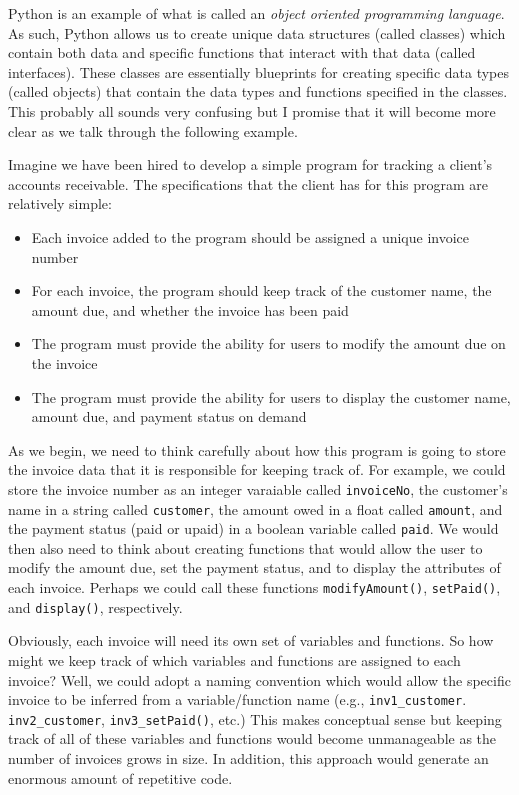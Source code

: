 \documentclass{book}
\begin{document}
Python is an example of what is called an \textit{object oriented programming language}. As such, Python allows us to create unique data structures (called classes) which contain both data and specific functions that interact with that data (called interfaces). These classes are essentially blueprints for creating specific data types (called objects) that contain the data types and functions specified in the classes. This probably all sounds very confusing but I promise that it will become more clear as we talk through the following example.

Imagine we have been hired to develop a simple program for tracking a client's accounts receivable. The specifications that the client has for this program are relatively simple:

\begin{itemize}
	\item Each invoice added to the program should be assigned a unique invoice number
	\item For each invoice, the program should keep track of the customer name, the amount due, and whether the invoice has been paid
	\item The program must provide the ability for users to modify the amount due on the invoice
	\item The program must provide the ability for users to display the customer name, amount due, and payment status on demand
\end{itemize}

As we begin, we need to think carefully about how this program is going to store the invoice data that it is responsible for keeping track of. For example, we could store the invoice number as an integer varaiable called \texttt{invoiceNo}, the customer's name in a string called \texttt{customer}, the amount owed in a float called \texttt{amount}, and the payment status (paid or upaid) in a boolean variable called \texttt{paid}. We would then also need to think about creating functions that would allow the user to modify the amount due, set the payment status, and to display the attributes of each invoice. Perhaps we could call these functions \texttt{modifyAmount()}, \texttt{setPaid()}, and \texttt{display()}, respectively.

Obviously, each invoice will need its own set of variables and functions. So how might we keep track of which variables and functions are assigned to each invoice? Well, we could adopt a naming convention which would allow the specific invoice to be inferred from a variable/function name (e.g., \texttt{inv1\_customer}. \texttt{inv2\_customer}, \texttt{inv3\_setPaid()}, etc.) This makes conceptual sense but keeping track of all of these variables and functions would become unmanageable as the number of invoices grows in size. In addition, this approach would generate an enormous amount of repetitive code.
\end{document}
